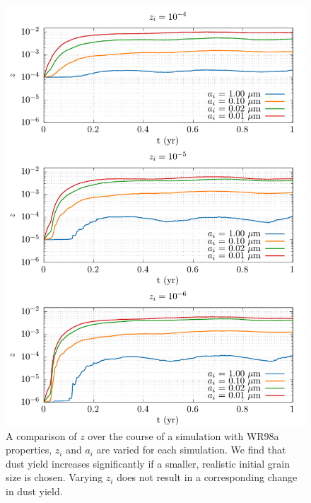 \begin{figure}[p]
  \centering
  \includegraphics{assets/a_z_tweaking/z.pdf}
  \caption[$z_i$ and $a_i$ parameter tweaking]{A comparison of $z$ over the course of a simulation with WR98a properties, $z_i$ and $a_i$ are varied for each simulation. We find that dust yield increases significantly if a smaller, realistic initial grain size is chosen. Varying $z_i$ does not result in a corresponding change in dust yield.}
  \label{fig:azweak_z}
\end{figure}

